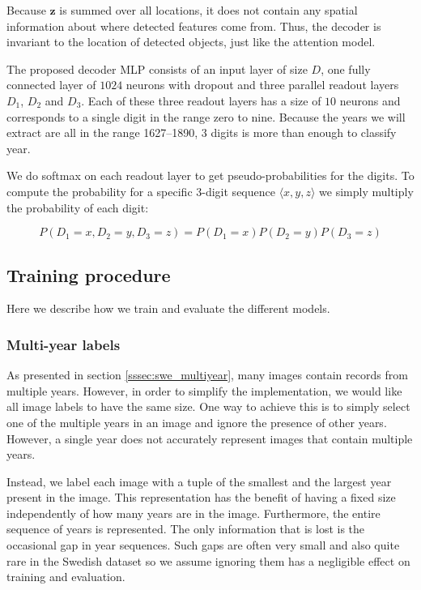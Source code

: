 Because $\mathbf{z}$ is summed over all locations, it does not contain any spatial information about where detected features come from.
Thus, the decoder is invariant to the location of detected objects, just like the attention model.

The proposed decoder MLP consists of an input layer of size $D$, one fully connected layer of $1024$ neurons with dropout and three parallel readout layers $D_1$, $D_2$ and $D_3$. Each of these three readout layers has a size of $10$ neurons and corresponds to a single digit in the range zero to nine.
Because the years we will extract are all in the range 1627--1890, $3$ digits is more than enough to classify year.

We do softmax on each readout layer to get pseudo-probabilities for the digits.
To compute the probability for a specific 3-digit sequence $\langle x, y, z \rangle$ we simply multiply the probability of each digit:

\[
P(D_1=x, D_2=y, D_3=z) = P(D_1=x) P(D_2=y) P(D_3=z)
\]


\subsection{Training procedure}

Here we describe how we train and evaluate the different models.

\subsubsection{Multi-year labels}

As presented in section \ref{sssec:swe_multiyear}, many images contain records from multiple years. However, in order to simplify the implementation, we would like all image labels to have the same size.
One way to achieve this is to simply select one of the multiple years in an image and ignore the presence of other years. However, a single year does not accurately represent images that contain multiple years.

Instead, we label each image with a tuple of the smallest and the largest year present in the image. This representation has the benefit of having a fixed size independently of how many years are in the image. Furthermore, the entire sequence of years is represented. The only information that is lost is the occasional gap in year sequences. Such gaps are often very small and also quite rare in the Swedish dataset so we assume ignoring them has a negligible effect on training and evaluation.

